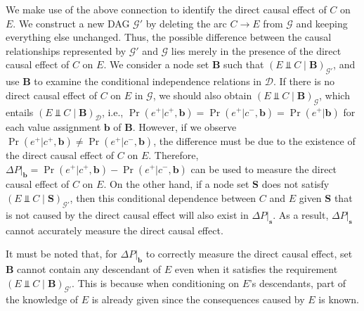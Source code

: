 \documentclass[twoside,leqno,twocolumn]{article}
\begin{document}
We make use of the above connection to identify the direct causal effect of $C$ on $E$. We construct a new DAG $\mathcal{G}'$ by deleting the arc $C\rightarrow E$ from $\mathcal{G}$ and keeping everything else unchanged. %
Thus, the possible difference between the causal relationships represented by $\mathcal{G}'$ and $\mathcal{G}$ lies merely in the presence of the direct causal effect of $C$ on $E$. We consider a node set $\mathbf{B}$ such that $(E\Perp C \mid \mathbf{B})_{\mathcal{G}'}$, and use $\mathbf{B}$ to examine the conditional independence relations in $\mathcal{D}$. If there is no direct causal effect of $C$ on $E$ in $\mathcal{G}$, we should also obtain $(E\Perp C \mid \mathbf{B})_{\mathcal{G}}$, which entails $(E\Perp C \mid \mathbf{B})_{\mathcal{D}}$, i.e., $\Pr(e^{+}|c^{+},\mathbf{b}) = \Pr(e^{+}|c^{-},\mathbf{b}) = \Pr(e^{+}|\mathbf{b})$ for each value assignment $\mathbf{b}$ of $\mathbf{B}$. However, if we observe $\Pr(e^{+}|c^{+},\mathbf{b})\neq \Pr(e^{+}|c^{-},\mathbf{b})$, the difference must be due to the existence of the direct causal effect of $C$ on $E$. Therefore, $\Delta P|_{\mathbf{b}}=\Pr(e^{+}|c^{+},\mathbf{b}) - \Pr(e^{+}|c^{-},\mathbf{b})$ can be used to measure the direct causal effect of $C$ on $E$. On the other hand, if a node set $\mathbf{S}$ does not satisfy $(E\Perp C \mid \mathbf{S})_{\mathcal{G}'}$, then this conditional dependence between $C$ and $E$ given $\mathbf{S}$ that is not caused by the direct causal effect will also exist in $\Delta P|_{\mathbf{s}}$. As a result, $\Delta P|_{\mathbf{s}}$ cannot accurately measure the direct causal effect.

It must be noted that, for $\Delta P|_{\mathbf{b}}$ to correctly measure the direct causal effect, set $\mathbf{B}$ cannot contain any descendant of $E$ even when it satisfies the requirement $(E\Perp C \mid \mathbf{B})_{\mathcal{G}'}$. This is because when conditioning on $E$'s descendants, part of the knowledge of $E$ is already given since the consequences caused by $E$ is known. %
\end{document}
